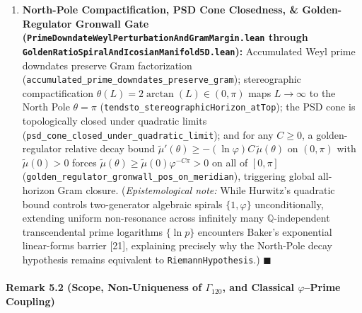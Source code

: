 \documentclass[
  11pt,
]{article}
\begin{document}
\begin{enumerate}
  discrete gradient flows on
  \(H_{\text{Gram}}(S, A) = \|S - A^T A\|_F^2\) dissipate monotonically
  (\(\langle R, A^T G + G^T A\rangle_F = 8\|AR\|_F^2 \ge 0\)), and
  inductive block-Schur lifting
  (\texttt{block\_schur\_cholesky\_gram\_induction}) certifies an
  explicit Gram factorization \(S = A^T A\) for every finite
  \(n \in \mathbb{N}\) with positive leading pivots.
\item
  \textbf{North-Pole Compactification, PSD Cone Closedness, \&
  Golden-Regulator Gronwall Gate
  (\texttt{PrimeDowndateWeylPerturbationAndGramMargin.lean} through
  \texttt{GoldenRatioSpiralAndIcosianManifold5D.lean}):} Accumulated
  Weyl prime downdates preserve Gram factorization
  (\texttt{accumulated\_prime\_downdates\_preserve\_gram});
  stereographic compactification \(\theta(L) = 2\arctan(L) \in (0,\pi)\)
  maps \(L \to \infty\) to the North Pole \(\theta = \pi\)
  (\texttt{tendsto\_stereographicHorizon\_atTop}); the PSD cone is
  topologically closed under quadratic limits
  (\texttt{psd\_cone\_closed\_under\_quadratic\_limit}); and for any
  \(C \ge 0\), a golden-regulator relative decay bound
  \(\tilde{\mu}'(\theta) \ge -(\ln\varphi) C\,\tilde{\mu}(\theta)\) on
  \((0,\pi)\) with \(\tilde{\mu}(0) > 0\) forces
  \(\tilde{\mu}(\theta) \ge \tilde{\mu}(0)\varphi^{-C\pi} > 0\) on all
  of \([0,\pi]\)
  (\texttt{golden\_regulator\_gronwall\_pos\_on\_meridian}), triggering
  global all-horizon Gram closure. (\emph{Epistemological note:} While
  Hurwitz's quadratic bound controls two-generator algebraic spirals
  \(\{1, \varphi\}\) unconditionally, extending uniform non-resonance
  across infinitely many \(\mathbb{Q}\)-independent transcendental prime
  logarithms \(\{\ln p\}\) encounters Baker's exponential linear-forms
  barrier {[}21{]}, explaining precisely why the North-Pole decay
  hypothesis remains equivalent to \texttt{RiemannHypothesis}.)
  \(\blacksquare\)
\end{enumerate}

\paragraph{\texorpdfstring{Remark 5.2 (Scope, Non-Uniqueness of
\(\Gamma_{120}\), and Classical \(\varphi\)--Prime
Coupling)}{Remark 5.2 (Scope, Non-Uniqueness of \textbackslash Gamma\_\{120\}, and Classical \textbackslash varphi--Prime Coupling)}}\label{remark-5.2-scope-non-uniqueness-of-gamma_120-and-classical-varphiprime-coupling}
\end{document}
